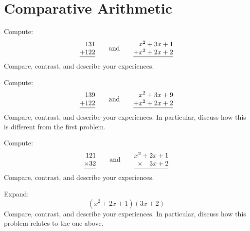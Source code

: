 \newpage
\section{Comparative Arithmetic}\label{A:CA}

\begin{prob} Compute:
\[
\begin{array}{@{}r@{}}
131\\
+122\\ \hline
\end{array}
\qquad\text{and}
\qquad
\begin{array}{@{}r@{}}
x^2+3x+1\\
+x^2+2x+2\\ \hline
\end{array}
\]
Compare, contrast, and describe your experiences.
\end{prob}

\begin{prob} Compute:
\[
\begin{array}{@{}r@{}}
139\\
+122\\ \hline
\end{array}
\qquad\text{and}
\qquad
\begin{array}{@{}r@{}}
x^2+3x+9\\
+x^2+2x+2\\ \hline
\end{array}
\]
Compare, contrast, and describe your experiences. In particular,
discuss how this is different from the first problem.
\end{prob}


\begin{prob} Compute:
\[
\begin{array}{@{}r@{}}
121\\
\times 32\\ \hline
\end{array}
\qquad\text{and}
\qquad
\begin{array}{@{}r@{}}
x^2+2x+1\\
\times~~~3x+2\\ \hline
\end{array}
\]
Compare, contrast, and describe your experiences.
\end{prob}

\begin{prob}
Expand:
\[
(x^2 + 2x + 1)(3x+2)
\]
Compare, contrast, and describe your experiences. In particular, discuss how this problem relates to the one above.
\end{prob}
